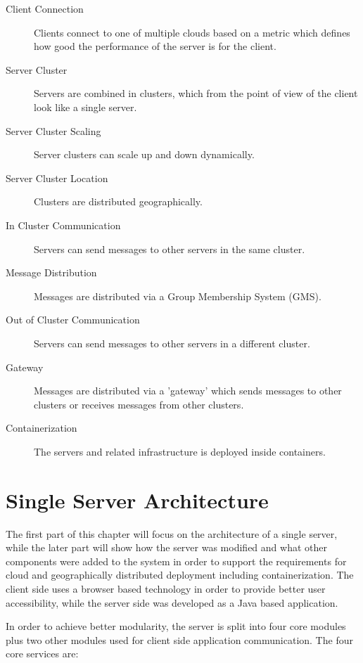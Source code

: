 \begin{description}
	\item[Client Connection] Clients connect to one of multiple clouds based on a metric which defines how good the performance of the server is for the client.
	\item[Server Cluster] Servers are combined in clusters, which from the point of view of the client look like a single server.
	\item[Server Cluster Scaling] Server clusters can scale up and down dynamically.
	\item[Server Cluster Location] Clusters are distributed geographically. 
	\item[In Cluster Communication] Servers can send messages to other servers in the same cluster.
	\item[Message Distribution] Messages are distributed via a Group Membership System (GMS).
	\item[Out of Cluster Communication] Servers can send messages to other servers in a different cluster.
	\item[Gateway] Messages are distributed via a 'gateway' which sends messages to other clusters or receives messages from other clusters.
	\item[Containerization] The servers and related infrastructure is deployed inside containers.
\end{description}

\section{Single Server Architecture}

The first part of this chapter will focus on the architecture of a single server, while the later part will show how the server was modified and what other components were added to the system in order to support the requirements for cloud and geographically distributed deployment including containerization. The client side uses a browser based technology in order to provide better user accessibility, while the server side was developed as a Java based application.

In order to achieve better modularity, the server is split into four core modules plus two other modules used for client side application communication. The four core services are:

